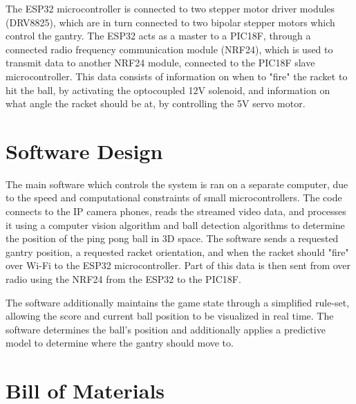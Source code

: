 The ESP32 microcontroller is connected to two stepper motor driver modules (DRV8825), which are in turn connected to two bipolar stepper motors which control the gantry. The ESP32 acts as a master to a PIC18F, through a connected radio frequency communication module (NRF24), which is used to transmit data to another NRF24 module, connected to the PIC18F slave microcontroller. This data consists of information on when to "fire" the racket to hit the ball, by activating the optocoupled 12V solenoid, and information on what angle the racket should be at, by controlling the 5V servo motor.

\section{Software Design}
The main software which controls the system is ran on a separate computer, due to the speed and computational constraints of small microcontrollers. The code connects to the IP camera phones, reads the streamed video data, and processes it using a computer vision algorithm and ball detection algorithms to determine the position of the ping pong ball in 3D space. The software sends a requested gantry position, a requested racket orientation, and when the racket should "fire" over Wi-Fi to the ESP32 microcontroller. Part of this data is then sent from over radio using the NRF24 from the ESP32 to the PIC18F.

The software additionally maintains the game state through a simplified rule-set, allowing the score and current ball position to be visualized in real time. The software determines the ball's position and additionally applies a predictive model to determine where the gantry should move to.


\section{Bill of Materials}


